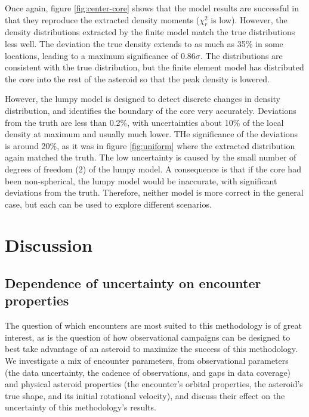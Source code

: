 \documentclass[fleqn,usenatbib]{mnras}
\begin{document}
Once again, figure \ref{fig:center-core} shows that the model results are successful in that they reproduce the extracted density moments ($\chi^2_r$ is low). However, the density distributions extracted by the finite model match the true distributions less well. The deviation the true density extends to as much as 35\% in some locations, leading to a maximum significance of $0.86\sigma$. The distributions are consistent with the true distribution, but the finite element model has distributed the core into the rest of the asteroid so that the peak density is lowered.

However, the lumpy model is designed to detect discrete changes in density distribution, and identifies the boundary of the core very accurately. Deviations from the truth are less than 0.2\%, with uncertainties about 10\% of the local density at maximum and usually much lower. THe significance of the deviations is around 20\%, as it was in figure \ref{fig:uniform} where the extracted distribution again matched the truth. The low uncertainty is caused by the small number of degrees of freedom (2) of the lumpy model. A consequence is that if the core had been non-spherical, the lumpy model would be inaccurate, with significant deviations from the truth. Therefore, neither model is more correct in the general case, but each can be used to explore different scenarios.




\section{Discussion}
\label{sec:discussion}


\subsection{Dependence of uncertainty on encounter properties}
\label{sec:fit-uncertainty}


The question of which encounters are most suited to this methodology is of great interest, as is the question of how observational campaigns can be designed to best take advantage of an asteroid to maximize the success of this methodology. We investigate a mix of encounter parameters, from observational parameters (the data uncertainty, the cadence of observations, and gaps in data coverage) and physical asteroid properties (the encounter's orbital properties, the asteroid's true shape, and its initial rotational velocity), and discuss their effect on the uncertainty of this methodology's results.
\end{document}
